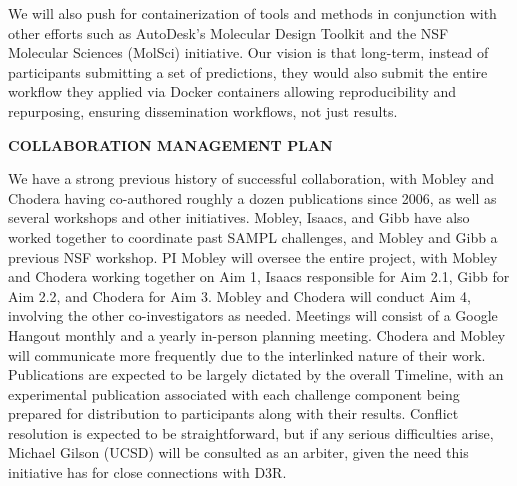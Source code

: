 \documentclass[11pt]{article}
\begin{document}
We will also push for containerization of tools and methods in conjunction with other efforts such as AutoDesk's Molecular Design Toolkit and the NSF Molecular Sciences (MolSci) initiative.
Our vision is that long-term, instead of participants submitting a set of predictions, they would also submit the entire workflow they applied via Docker containers allowing reproducibility and repurposing, ensuring dissemination workflows, not just results.



{\large \bf COLLABORATION MANAGEMENT PLAN} %

We have a strong previous history of successful collaboration, with Mobley and Chodera having co-authored roughly a dozen publications since 2006, as well as several workshops and other initiatives.
Mobley, Isaacs, and Gibb have also worked together to coordinate past SAMPL challenges, and Mobley and Gibb a previous NSF workshop. 
PI Mobley will oversee the entire project, with Mobley and Chodera working together on Aim 1, Isaacs responsible for Aim 2.1, Gibb for Aim 2.2, and Chodera for Aim 3. Mobley and Chodera will conduct Aim 4, involving the other co-investigators as needed.
Meetings will consist of a Google Hangout monthly and a yearly in-person planning meeting.
Chodera and Mobley will communicate more frequently due to the interlinked nature of their work.
Publications are expected to be largely dictated by the overall Timeline, with an experimental publication associated with each challenge component being prepared for distribution to participants along with their results.
Conflict resolution is expected to be straightforward, but if any serious difficulties arise, Michael Gilson (UCSD) will be consulted as an arbiter, given the need this initiative has for close connections with D3R.
\end{document}
